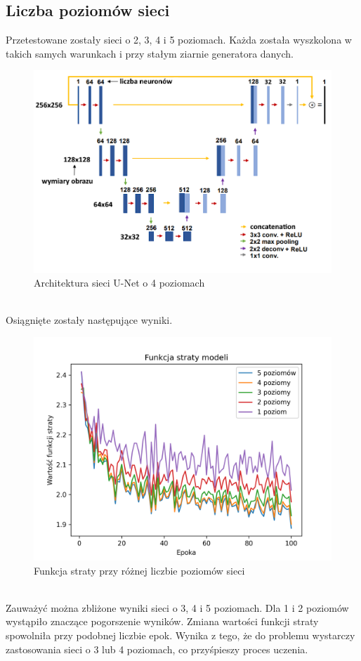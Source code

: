 \documentclass[a4paper,11pt]{article}
\begin{document}
\subsection{Liczba poziomów sieci}
Przetestowane zostały sieci o 2, 3, 4 i 5 poziomach. Każda została wyszkolona w takich samych warunkach i przy stałym ziarnie generatora danych.
\begin{figure}[h!]
\begin{center}
	\includegraphics[width=0.9\columnwidth]{unet4.png}
	\caption{Architektura sieci U-Net o 4 poziomach}
\end{center}
\end{figure}
\\
Osiągnięte zostały następujące wyniki.
\\
\begin{figure}[h!]
\begin{center}
	\includegraphics[width=0.7\columnwidth]{layers.png}
	\caption{Funkcja straty przy różnej liczbie poziomów sieci}
\end{center}
\end{figure}
\\
Zauważyć można zbliżone wyniki sieci o 3, 4 i 5 poziomach.
Dla 1 i 2 poziomów wystąpiło znaczące pogorszenie wyników. Zmiana wartości funkcji straty spowolniła przy podobnej liczbie epok.
Wynika z tego, że do problemu wystarczy zastosowania sieci o 3 lub 4 poziomach, co przyśpieszy proces uczenia.
\end{document}
